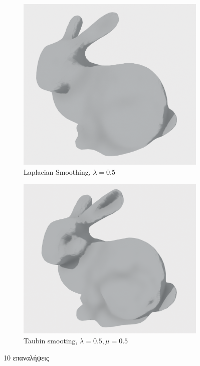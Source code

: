 \documentclass{article}
\begin{document}
\begin{figure}[h]
	\begin{subfigure}{0.5\textwidth}
		\includegraphics[width=0.9\linewidth]{"2.png"}
		\caption{Laplacian Smoothing, $\lambda = 0.5$}
	\end{subfigure}
	\begin{subfigure}{0.5\textwidth}
		\includegraphics[width=0.9\linewidth]{"3.png"}
		\caption{Taubin smooting, $\lambda = 0.5, \mu = 0.5$}
	\end{subfigure}
	\caption{10 επαναλήψεις}
\end{figure}
\end{document}

